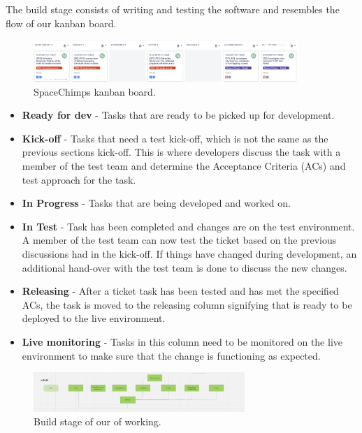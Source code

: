   \vspace{0.2cm}

  The build stage consists of writing and testing the software and resembles the flow of our kanban board.

  \begin{figure}[H]
    \centering
    \includegraphics[width=10cm]{assets/kanbanBoard.png}
    \caption{SpaceChimps kanban board.}
    \label{fig:kanbanBoard2}
  \end{figure}

  \begin{itemize}
    \item \textbf{Ready for dev} - Tasks that are ready to be picked up for development.
    \item \textbf{Kick-off} - Tasks that need a test kick-off, which is not the same as the previous sections kick-off. This is where developers
    discuss the task with a member of the test team and determine the Acceptance Criteria (ACs) and test approach for the task.
    \item \textbf{In Progress} - Tasks that are being developed and worked on.
    \item \textbf{In Test} - Task has been completed and changes are on the test environment. A member of the test team can now test the ticket
    based on the previous discussions had in the kick-off. If things have changed during development, an additional hand-over with the test team 
    is done to discuss the new changes.
    \item \textbf{Releasing} - After a ticket task has been tested and has met the specified ACs, the task is moved to the releasing column signifying 
    that is ready to be deployed to the live environment.
    \item \textbf{Live monitoring} - Tasks in this column need to be monitored on the live environment to make sure that the change is functioning as expected.
  \end{itemize}

  \begin{figure}[H]
    \centering
    \includegraphics[width=8cm]{assets/workflow/build.png}
    \caption{Build stage of our of working.}
    \label{fig:workflowBuild}
  \end{figure}

